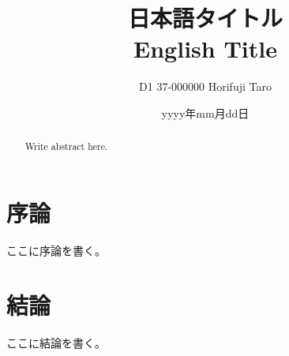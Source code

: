 \documentclass[10pt,a4paper,oneside,twocolumn,fleqn,dvipdfmx]{jsarticle}
\date{yyyy年mm月dd日}
\title{日本語タイトル\\ English Title}
\author{D1 37-000000 Horifuji Taro}
\affiliation{Hori \& Fujimoto Laboratory\\Department of Electrical Engineering}
\makeatletter
\renewcommand{\maketitle}{
    \centering{
        \framebox[\linewidth]{
            \parbox{\linewidth-2ex}{
            \vskip 0.5ex
            \@documentname \hfill {\@date}\\
            \parbox{\linewidth-2ex}{
                \vskip 2ex
                \centering {\Large \bf \@title \par}
                \vskip 2ex
                }
            \@affiliation \hfill \@author
            }
        }
    }
    \vskip 2ex
    \ifvoid\@abstractbox\else\centerline{\box\@abstractbox}
}
\makeatother
\begin{document}
\begin{abstract}
Write abstract here.
\end{abstract}

\twocolumn[\maketitle]

\section{序論}
ここに序論を書く。

\section{結論}
ここに結論を書く。



\end{document}
